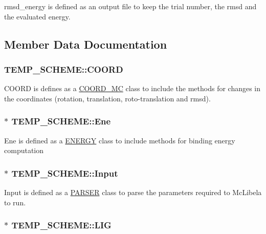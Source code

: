 rmsd\_\-energy is defined as an output file to keep the trial number, the rmsd and the evaluated energy. 

\subsection{Member Data Documentation}
\hypertarget{classTEMP__SCHEME_a19735d7289371ff5f3820f08cd8195c4}{
\subsubsection[{COORD}]{ {\bf TEMP\_\-SCHEME::COORD}}}
\label{classTEMP__SCHEME_a19735d7289371ff5f3820f08cd8195c4}
COORD is defines as a \hyperlink{classCOORD__MC}{COORD\_\-MC} class to include the methods for changes in the coordinates (rotation, translation, roto-\/translation and rmsd). \hypertarget{classTEMP__SCHEME_a37a22443ee63f4f78754725e1345a1c2}{
\subsubsection[{Ene}]{$\ast$ {\bf TEMP\_\-SCHEME::Ene}}}
\label{classTEMP__SCHEME_a37a22443ee63f4f78754725e1345a1c2}
Ene is defined as a \hyperlink{classENERGY}{ENERGY} class to include methods for binding energy computation \hypertarget{classTEMP__SCHEME_a6ca6229d43f1d6d77e444f3eecf71d18}{
\subsubsection[{Input}]{$\ast$ {\bf TEMP\_\-SCHEME::Input}}}
\label{classTEMP__SCHEME_a6ca6229d43f1d6d77e444f3eecf71d18}
Input is defined as a \hyperlink{classPARSER}{PARSER} class to parse the parameters required to McLibela to run. \hypertarget{classTEMP__SCHEME_a71d6c0e26c014ff21a9e968c0f7fd38b}{
\subsubsection[{LIG}]{$\ast$ {\bf TEMP\_\-SCHEME::LIG}}}
